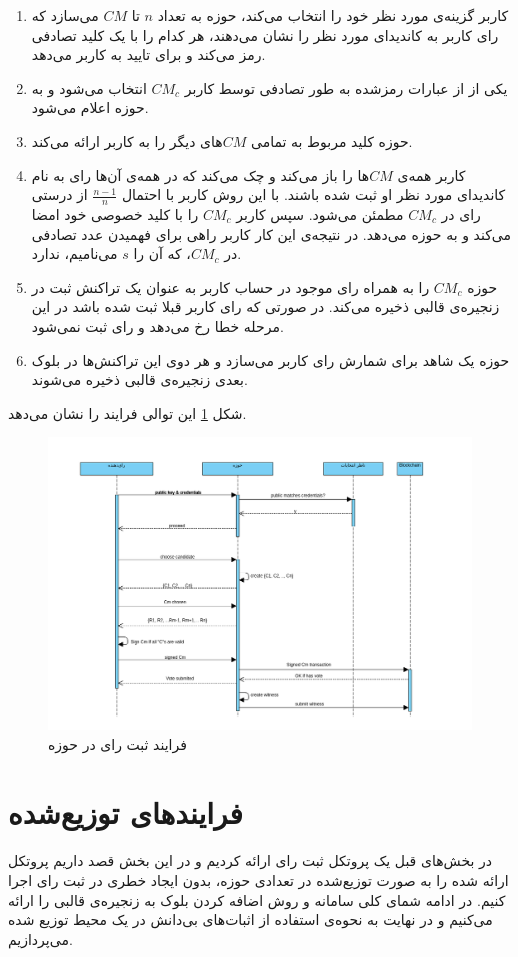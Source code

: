 \begin{enumerate}
	\item 
	کاربر گزینه‌ی مورد نظر خود را انتخاب می‌کند، حوزه به تعداد $n$ تا $CM$ می‌سازد که رای کاربر به کاندیدای مورد نظر را نشان می‌دهند، هر کدام را با یک کلید تصادفی رمز می‌کند و برای تایید به کاربر می‌دهد. 
	\item 
	یکی از از عبارات رمزشده به طور تصادفی توسط کاربر $CM_c$ انتخاب می‌شود و به حوزه اعلام می‌شود.
	\item 
	حوزه کلید مربوط به تمامی $CM$های دیگر را به کاربر ارائه می‌کند.
	\item 
	کاربر همه‌ی $CM$ها را باز می‌کند و چک می‌کند که در همه‌ی آن‌ها رای به نام کاندیدای مورد نظر او ثبت شده باشند. با این روش کاربر با احتمال $\frac{n-1}{n}$ از درستی رای در $CM_c$ مطمئن می‌شود. سپس کاربر $CM_c$ را با کلید خصوصی خود امضا می‌کند و به حوزه می‌دهد. در نتیجه‌ی این کار کاربر راهی برای فهمیدن عدد تصادفی در $CM_c$، که آن را $s$ می‌نامیم، ندارد.
	\item
	حوزه $CM_c$ را به همراه رای موجود در حساب کاربر به عنوان یک تراکنش ثبت در زنجیره‌ی قالبی ذخیره می‌کند. در صورتی که رای کاربر قبلا ثبت شده باشد در این مرحله خطا رخ می‌دهد و رای ثبت نمی‌شود. 
	\item
	حوزه یک شاهد برای شمارش رای کاربر می‌سازد و هر دوی این تراکنش‌ها در بلوک بعدی زنجیره‌ی قالبی ذخیره می‌شوند.
\end{enumerate}
شکل \ref{fig:seqdiag.png} این توالی فرایند را نشان می‌دهد.
\begin{figure}[h!]
	\centering
	\includegraphics[width=0.9\linewidth]{seqdiag.png}
	\caption {فرایند ثبت رای در حوزه}
	\label{fig:seqdiag.png}
\end{figure}

\section{فرایند‌های توزیع‌شده}
در بخش‌های قبل یک پروتکل ثبت رای‌ ارائه کردیم و در این بخش قصد داریم پروتکل ارائه شده را به صورت توزیع‌شده در تعدادی حوزه، بدون ایجاد خطری در ثبت رای اجرا کنیم. در ادامه شمای کلی سامانه و روش‌ اضافه کردن بلوک به زنجیره‌ی قالبی را ارائه می‌کنیم و در نهایت به نحوه‌ی استفاده از اثبات‌های بی‌دانش در یک محیط توزیع شده می‌پردازیم.
